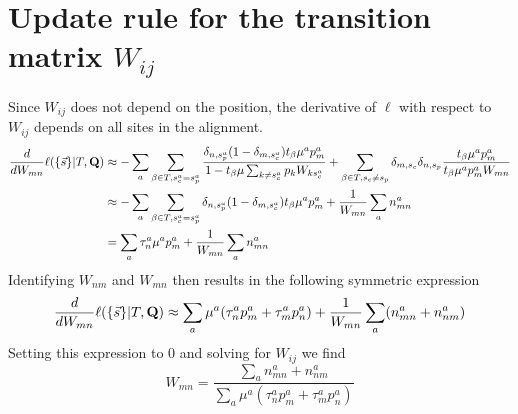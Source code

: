\documentclass[aps,rmp,onecolumn]{revtex4}
\newcommand{\mat}[1]{{\bf #1}}
\newcommand{\eqp}{p}
\newcommand{\lh}{\ell}
\begin{document}
\section*{Update rule for the transition matrix $W_{ij}$}
Since $W_{ij}$ does not depend on the position, the derivative of $\lh$ with respect to $W_{ij}$ depends on all sites in the alignment.
\begin{equation}
\begin{split}
	\frac{d}{d W_{mn}} \lh (\{\vec{s}\} |T, \mat{Q}) & \approx
	-\sum_a\sum_{\beta\in T,s^a_c=s^a_p} \frac{\delta_{n,s^a_p}(1-\delta_{m,s^a_c})t_\beta \mu^a \eqp^a_m}{1 - t_\beta\mu \sum_{k\neq s^a_c} \eqp_k W_{ks^a_c}}
	 + \sum_{\beta\in T,s_c\neq s_p} \delta_{m,s_c}\delta_{n,s_p} \frac{t_\beta \mu^a \eqp^a_m}{t_\beta \mu^a \eqp^a_{m} W_{m n}}\\
	 &\approx -\sum_a\sum_{\beta\in T,s^a_c=s^a_p}  \delta_{n,s^a_p}(1-\delta_{m,s^a_c})t_\beta \mu^a \eqp^a_m + \frac{1}{W_{mn}}\sum_a n^a_{mn}\\
	 & = \sum_a \tau^{a}_{n} \mu^a \eqp^a_m  + \frac{1}{W_{mn}}\sum_a n^a_{mn}
\end{split}
\end{equation}
Identifying $W_{nm}$ and $W_{mn}$ then results in the following symmetric expression
\begin{equation}
	\frac{d}{d W_{mn}} \lh (\{\vec{s}\} |T, \mat{Q}) \approx \sum_a \mu^a (\tau^{a}_{n} \eqp^a_m + \tau^{a}_{m} \eqp^a_n)  + \frac{1}{W_{mn}}\sum_a (n^a_{mn}+ n^a_{nm})
\end{equation}
Setting this expression to 0 and solving for $W_{ij}$ we find
\begin{equation}
	W_{mn} = \frac{\sum_a n^a_{mn}+ n^a_{nm}}{\sum_a \mu^a(\tau^{a}_{n} \eqp^a_m + \tau^{a}_{m} \eqp^a_n)}
\end{equation}
\end{document}

